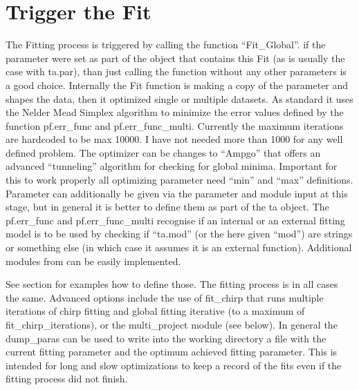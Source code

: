 \documentclass[letterpaper,10pt,english]{sphinxmanual}
\begin{document}
\section{Trigger the Fit}
\label{\detokenize{Fitting:trigger-the-fit}}
The Fitting process is triggered by calling the function “Fit\_Global”.
if the parameter were set as part of the object that contains this Fit
(as is usually the case with ta.par), than just calling the function
without any other parameters is a good choice. Internally the Fit
function is making a copy of the parameter and shapes the data, then it
optimized single or multiple datasets. As standard it uses the Nelder
Mead Simplex algorithm to minimize the error values defined by the
function pf.err\_func and pf.err\_func\_multi. Currently the maximum
iterations are hard\sphinxhyphen{}coded to be max 10000. I have not needed more than
1000 for any well defined problem. The optimizer can be changes to
“Ampgo” that offers an advanced “tunneling” algorithm for checking for
global minima. Important for this to work properly all optimizing
parameter need “min” and “max” definitions. Parameter can additionally
be given via the parameter and module input at this stage, but in
general it is better to define them as part of the ta object. The
pf.err\_func and pf.err\_func\_multi recognise if an internal or an
external fitting model is to be used by checking if “ta.mod” (or the
here given “mod”) are strings or something else (in which case it
assumes it is an external function). Additional modules from 
can be easily implemented.

See section
{\hyperref[\detokenize{Fitting:external-kinetic-models-as-defined-in-example-file-plot-func-function-library-py}]{}}
for examples how to define those. The fitting process is in all cases
the same. Advanced options include the use of fit\_chirp that runs
multiple iterations of chirp fitting and global fitting iterative (to a
maximum of fit\_chirp\_iterations), or the multi\_project module (see
below). In general the dump\_paras can be used to write into the working
directory a file with the current fitting parameter and the optimum
achieved fitting parameter. This is intended for long and slow
optimizations to keep a record of the fits even if the fitting process
did not finish.

{\hyperref[\detokenize{plot_func:plot_func.TA.Fit_Global}]{}}
\end{document}
